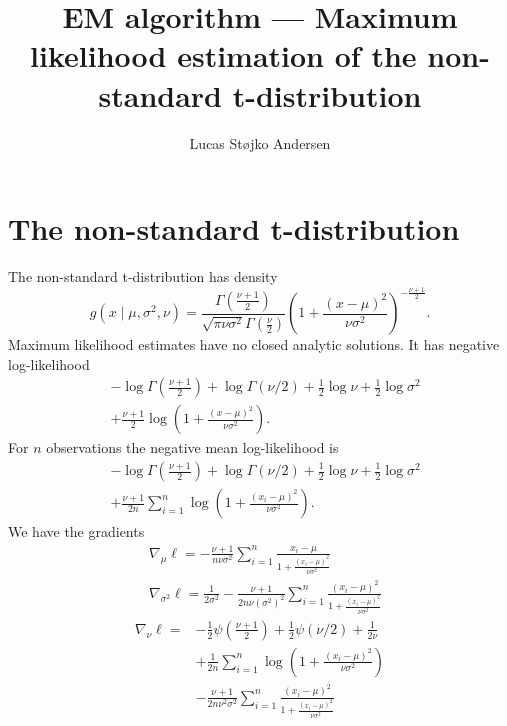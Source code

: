 \documentclass[a4paper,12pt]{article}
\title{EM algorithm --- Maximum likelihood estimation of the non-standard t-distribution}
\author{Lucas Støjko Andersen}
\begin{document}
\maketitle
\section{The non-standard t-distribution}
The non-standard t-distribution has density
\begin{equation}
    \label{eq:marginal}
    g(x\mid\mu,\sigma^2,\nu)=\frac{\Gamma\left(\frac{\nu + 1}{2}\right)}{\sqrt{\pi\nu\sigma^2}\Gamma\left(\frac{\nu}{2}\right)}\left(1+\frac{(x - \mu)^2}{\nu\sigma^2}\right)^{-\frac{\nu + 1}{2}}.
\end{equation}
Maximum likelihood estimates have no closed analytic solutions. It has negative log-likelihood
\begin{align*}
    &-\log \Gamma\left(\frac{\nu + 1}{2}\right) +
    \log\Gamma(\nu / 2) +
    \frac{1}{2}\log\nu +
    \frac{1}{2}\log\sigma^2\\ &+
    \frac{\nu + 1}{2}\log\left(1 + \frac{(x - \mu)^2}{\nu\sigma^2}\right).
\end{align*}
For $n$ observations the negative mean log-likelihood is
\begin{align*}
    &-\log \Gamma\left(\frac{\nu + 1}{2}\right) +
    \log\Gamma(\nu / 2) +
    \frac{1}{2}\log\nu +
    \frac{1}{2}\log\sigma^2\\ &+
    \frac{\nu + 1}{2n}\sum_{i=1}^{n}\log\left(1 + \frac{(x_{i} - \mu)^2}{\nu\sigma^2}\right).
\end{align*}
We have the gradients
\begin{align*}
    &\nabla_{\mu}\ell = -\frac{\nu + 1}{n\nu\sigma^2}\sum_{i=1}^{n}\frac{x_{i} - \mu}{1 + \frac{(x_{i}-\mu)^2}{\nu\sigma^2}} \\
    &\nabla_{\sigma^2}\ell = \frac{1}{2\sigma^2} -
    \frac{\nu + 1}{2n\nu(\sigma^2)^2}\sum_{i=1}^{n}\frac{(x_{i}-\mu)^2}{1 + \frac{(x_{i}-\mu)^2}{\nu\sigma^2}}    
\end{align*}
\begin{align*}
    \nabla_{\nu}\ell = &-\frac{1}{2}\psi\left(\frac{\nu + 1}{2}\right) +
    \frac{1}{2}\psi(\nu / 2) +
    \frac{1}{2\nu} \\ &+
    \frac{1}{2n}\sum_{i=1}^{n}\log\left(1 + \frac{(x_{i} - \mu)^2}{\nu\sigma^2}\right) \\ &-
    \frac{\nu + 1}{2n\nu^2\sigma^2}\sum_{i=1}^{n}\frac{(x_{i}-\mu)^2}{1 + \frac{(x_{i}-\mu)^2}{\nu\sigma^2}}
\end{align*}
\end{document}
